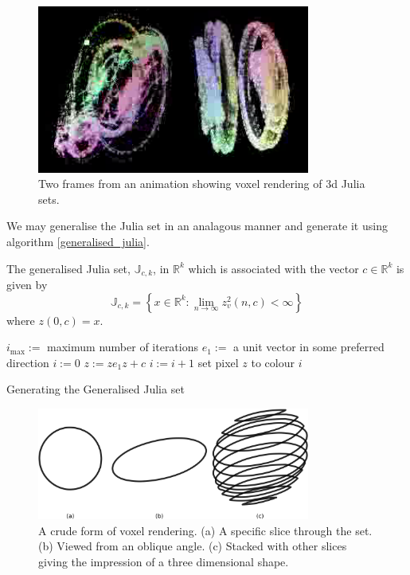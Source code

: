 \begin{figure}
\centering
\includegraphics[width=0.8\textwidth]{3djulia_pair}
\caption{\label{fig:3djulia}
  Two frames from an animation\cite{FRAC:JuliaAnimation} showing voxel
          rendering of 3d Julia sets.}
\end{figure}

We may generalise the Julia set in an analagous manner and generate it
using algorithm \ref{generalised_julia}.

\begin{definition}
The generalised Julia set, $\mathbb{J}_{c,k}$, in $\mathbb{R}^k$
which is associated with the vector $c \in \mathbb{R}^k$ is given by
\[
\mathbb{J}_{c,k} = 
\left\{x \in \mathbb{R}^k
: \lim_{n \rightarrow \infty} z_v^2(n,c) < \infty \right\} 
\]
where $z(0,c) = x$.
\end{definition}

\begin{fancyalg}
\begin{algorithmic}[1]
\STATE $i_{\mbox{max}} :=$ maximum number of iterations
\STATE $e_1 :=$ a unit vector in some preferred direction
\STATE $i := 0$
  \STATE $z := ze_1z + c$
  \STATE $i := i+1$
\ENDWHILE 
\STATE set pixel $z$ to colour $i$
\ENDFOR
\end{algorithmic}
\caption{
\label{alg:generalised_julia}
  Generating the Generalised Julia set}
\end{fancyalg}

\begin{figure}
\centering
\includegraphics[width=0.8\textwidth]{voxel}
\caption{\label{fig:voxel}
  A crude form of voxel rendering. (a) A specific slice through the set. (b) Viewed from
  an oblique angle. (c) Stacked with other slices giving the impression of a three
  dimensional shape.
}
\end{figure}

